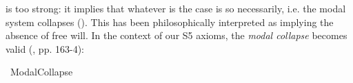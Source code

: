 \begin{isabellebody}
\begin{isamarkuptext}
is too strong: it implies that whatever is the case is so necessarily, i.e. the modal system collapses (\isa{{\isasymphi}\ {\isasymlongrightarrow}\ {\isasymbox}{\isasymphi}}).
This has been philosophically interpreted as implying the absence of free will.    
In the context of our S5 axioms, the \emph{modal collapse} becomes valid (\cite{Fitting}, pp. 163-4):%
\end{isamarkuptext}\isamarkuptrue%
\isamarkupfalse%
\ ModalCollapse{\isacharcolon}\ {\isachardoublequoteopen}{\isasymlfloor}\isactrlbold {\isasymforall}{\isasymPhi}{\isachardot}{\isacharparenleft}{\isasymPhi}\ \isactrlbold {\isasymrightarrow}\ {\isacharparenleft}\isactrlbold {\isasymbox}\ {\isasymPhi}{\isacharparenright}{\isacharparenright}{\isasymrfloor}{\isachardoublequoteclose}%
\ %
%
\isamarkupfalse%
\ {\isacharminus}\ %
%
%
%
%
%
%
%
%
%
%
\end{isabellebody}%
